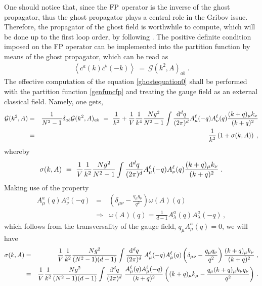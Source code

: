 One should notice that, since the $\mathrm{FP}$ operator is the inverse of the ghost propagator, thus
the ghost propagator plays a central role in the Gribov issue. Therefore, the propagator of the
ghost field is worthwhile to compute, which will be done up to the first loop order, by
following \cite{Gribov:1977wm}. The positive definite condition imposed on the FP operator can
be implemented into the partition function by means of the ghost propagator, which can be read
as
\begin{eqnarray}
\left\langle  c^{a}(k) \overline{c}^{b}(-k)  \right\rangle ~=~ \mathcal G (k^2, A)_{ab}\;.
\label{ghostequation0}
\end{eqnarray}
The effective computation of the equation \eqref{ghostequation0} shall be performed with the
partition function \eqref{genfuncfp} and treating the gauge field as an external classical
field. Namely, one gets,
\begin{eqnarray}
\mathcal G (k^2, A) &=&  \frac{1}{N^2 -1}\delta_{ab} \mathcal G (k^2, A)_{ab} ~=~
\frac{1}{k^2} + \frac{1}{V}\frac{1}{k^4} \frac{N g^2}{N^2 - 1} \int\frac{ \mathrm{d}^d q}{(2 \pi)^d}
A_\mu^\ell(-q) A_\nu^{\ell} (q)  \frac{(k+q)_\mu  k_\nu}{(k+q)^2} \nonumber\\
&=& \frac{1}{k^2}\left( 1 + \sigma(k, A) \right)\;,
\label{coloraway}
\end{eqnarray}
whereby
\begin{eqnarray}
\sigma(k,A) ~=~ \frac{1}{V}\frac{1}{k^2} \frac{Ng^2}{N^2 - 1} \int\frac{ \mathrm{d}^d q}{(2 \pi)^d}
A_\mu^\ell(-q) A_\nu^{\ell} (q) \frac{ (k+q)_\mu  k_\nu }{(k+q)^2}\;.
\label{1ghostformfacto}
\end{eqnarray}
Making use of the property
\begin{eqnarray}
A_{\mu }^{a}(q)A_{\nu }^{a}(-q) &=&
\left( \delta _{\mu \nu }-\frac{q_{\mu }q_{\nu }}{q^{2}}\right) \omega (A)(q)   
\nonumber \\
&\Rightarrow &\omega (A)(q)=\frac{1}{d-1}A_{\lambda }^{a}(q)A_{\lambda }^{a}(-q)\,,
\end{eqnarray}
which follows from the transversality of the gauge field, $q_\mu A^a_\mu(q)=0$, 
we will have
\begin{eqnarray}
\sigma(k,A) &=& \frac{1}{V}\frac{1}{k^2} \frac{Ng^2}{(N^2 - 1)(d-1)} 
\int\frac{ \mathrm{d}^d q}{(2 \pi)^d}\;
A_\mu^\ell(-q) A_\mu^{\ell}(q)
\left( \delta _{\mu \nu }-\frac{q_{\mu }q_{\nu }}{q^{2}}\right) 
\frac{ (k+q)_\mu  k_\nu }{(k+q)^2}
\;,
\nonumber \\
&=& 
\frac{1}{V}\frac{1}{k^2} \frac{Ng^2}{(N^2 - 1)(d-1)} 
\int\frac{ \mathrm{d}^d q}{(2 \pi)^d}\;
\frac{A_\mu^\ell(q) A_\mu^{\ell}(-q)}{(k+q)^2}
\left( (k+q)_\mu  k_\mu -\frac{q_{\mu }(k+q)_\mu  k_\nu q_{\nu}}{q^{2}} 
\right)
\,.
\nonumber \\
\label{1ghostformfacto3}
\end{eqnarray}
